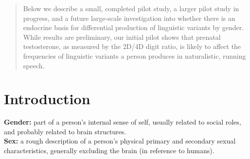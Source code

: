 \documentclass[a0,portrait]{a0poster}
\begin{document}
\begin{multicols}{2} %


\color{Navy} %

\begin{abstract}

Below we describe a small, completed pilot study, a larger pilot study in progress, and a future large-scale investigation into whether there is an endocrine basis for differential production of linguistic variants by gender. While results are preliminary, our initial pilot shows that prenatal testosterone, as measured by the 2D/4D digit ratio, is likely to affect the frequencies of linguistic variants a person produces in naturalistic, running speech.

\end{abstract}


\color{SaddleBrown} %

\section*{Introduction}


\textbf{Gender:} part of a person's internal sense of self, usually related to social roles, and probably related to brain structures.\\
\textbf{Sex:} a rough description of a person's physical primary and secondary sexual characteristics, generally excluding the brain (in reference to humans).


\end{multicols}
\end{document}
